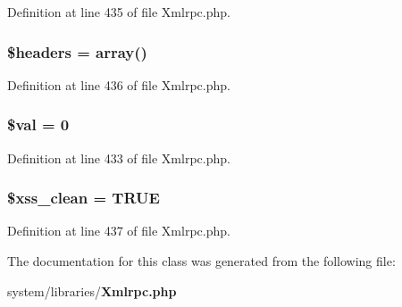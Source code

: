 Definition at line 435 of file Xmlrpc.\-php.

\subsubsection[{\$headers}]{\setlength{\rightskip}{0pt plus 5cm}\$headers = array()}\label{class_x_m_l___r_p_c___response_a52500036ee807241b8b4b7e2367c49ef}


Definition at line 436 of file Xmlrpc.\-php.

\subsubsection[{\$val}]{\setlength{\rightskip}{0pt plus 5cm}\$val = 0}\label{class_x_m_l___r_p_c___response_aac81a74a7b30767af29bfd9a695636df}


Definition at line 433 of file Xmlrpc.\-php.

\subsubsection[{\$xss\-\_\-clean}]{\setlength{\rightskip}{0pt plus 5cm}\$xss\-\_\-clean = T\-R\-U\-E}\label{class_x_m_l___r_p_c___response_a0f2ee8861c0b3164a5c6e126dd98c0cc}


Definition at line 437 of file Xmlrpc.\-php.



The documentation for this class was generated from the following file\-:\begin{DoxyCompactItemize}
\item 
system/libraries/{\bf Xmlrpc.\-php}\end{DoxyCompactItemize}
